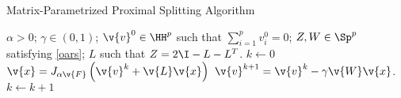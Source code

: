 \begin{algorithm} 
    \caption{Matrix-Parametrized Proximal Splitting Algorithm}\label{n_iteration} 
    \begin{algorithmic}[1] 
    \Require $\alpha > 0$; $\gamma \in (0,1)$; $\v{v}^0 \in \HH^p$ such that $\sum_{i=1}^p v_i^0 = 0$; $Z, W \in \Sp^p$ satisfying \eqref{oars}; $L$ such that $Z=2\I - L - L^T$.
    \State $k \gets 0$
    \Repeat
      \State $\v{x} = J_{\alpha \v{F}}\left(\v{v}^{k} + \v{L} \v{x}\right)$\label{n_itr1}
      \State $\v{v}^{k+1} = \v{v}^{k} - \gamma \v{W} \v{x}$.\label{n_itr2}
      \State $k \gets k+1$
\end{algorithmic}
\end{algorithm}
